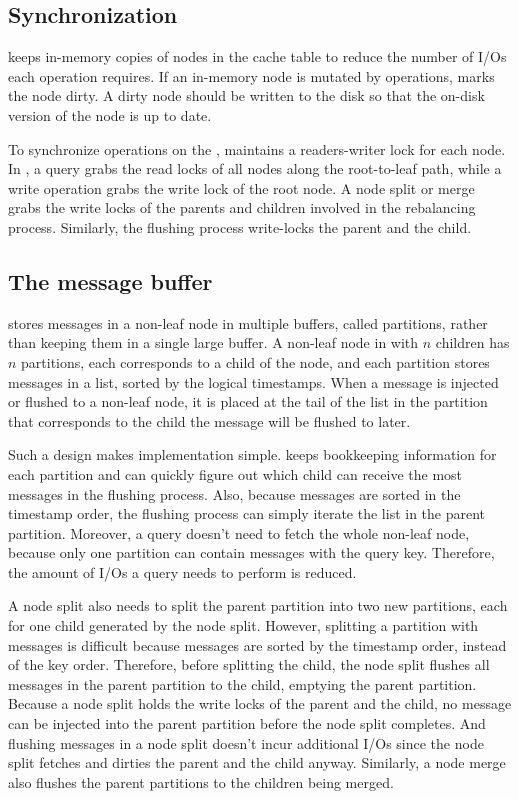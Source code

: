 \subsection{Synchronization}
\label{sec:bg:impl:sync}

\Fti keeps in-memory copies of nodes in the cache table to reduce the
number of I/Os each operation requires.
If an in-memory node is mutated by \bet operations,
\fti marks the node dirty.
A dirty node should be written to the disk so that the on-disk version of the
node is up to date.

To synchronize operations on the \bet,
\fti maintains a readers-writer lock for each \bet node.
In \fti, a query grabs the read locks of all nodes along the root-to-leaf path,
while a write operation grabs the write lock of the root node.
A node split or merge grabs the write locks of the parents and children
involved in the rebalancing process.
Similarly, the flushing process write-locks the parent and the child.

\subsection{The message buffer}
\label{sec:bg:impl:partition}

\Fti stores messages in a non-leaf node in multiple buffers, called partitions,
rather than keeping them in a single large buffer.
A non-leaf node in \fti with $n$ children has $n$ partitions, each corresponds
to a child of the node, and each partition stores messages in a list, sorted
by the logical timestamps.
When a message is injected or flushed to a non-leaf node, it is placed at the
tail of the list in the partition
that corresponds to the child the message will be flushed to later.

Such a design makes implementation simple.
\Fti keeps bookkeeping information for each partition and can
quickly figure out which child can receive the most messages
in the flushing process.
Also, because messages are sorted in the timestamp order, the flushing process
can simply iterate the list in the parent partition.
Moreover, a query doesn't need to fetch the whole non-leaf node,
because only one partition can contain messages with the query key.
Therefore, the amount of I/Os a query needs to perform is reduced.

A node split also needs to split the parent partition into two
new partitions, each for one child generated by the node split.
However, splitting a partition with messages is difficult because messages are
sorted by the timestamp order, instead of the key order.
Therefore, before splitting the child, the node split flushes all messages in
the parent partition to the child, emptying the parent partition.
Because a node split holds the write locks of the parent and the child,
no message can be injected into the parent partition
before the node split completes.
And flushing messages in a node split doesn't incur additional I/Os
since the node split fetches and dirties the parent and the child anyway.
Similarly, a node merge also flushes the parent partitions to the children being
merged.

